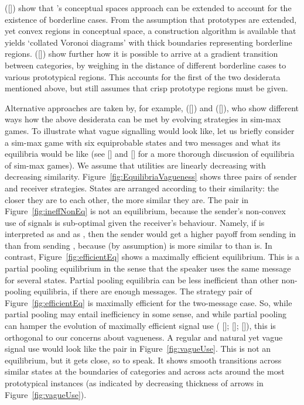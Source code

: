 \documentclass[12pt,english]{article}
\numberwithin{equation}{section}
\newcommand{\citetbjps}[1]{\citeauthor{#1} ([\citeyear{#1}])}
\newcommand{\citealtbjps}[1]{\citeauthor{#1} [\citeyear{#1}]}
\begin{document}
\citetbjps{DouvenDecock2011:Vagueness:-A-Co} show that
\citeauthor{Gardenfors2000:Conceptual-Spac}'s conceptual spaces
approach can be extended to account for the existence of borderline
cases. From the assumption that prototypes are extended, yet convex
regions in conceptual space, a construction algorithm is available
that yields `collated Voronoi diagrams' with thick boundaries
representing borderline
regions. \citetbjps{DecockDouven2012:What-is-Graded-} show further how it
is possible to arrive at a gradient transition between categories, by
weighing in the distance of different borderline cases to various
prototypical regions. This accounts for the first of the two
desiderata mentioned above, but still assumes that crisp prototype
regions must be given.

Alternative approaches are taken by, for example, \citetbjps{FrankeJager2010:Vagueness-Signa} and
\citetbjps{OConnor2013:The-Evolution-o}, who show different ways how the above desiderata can be
met by evolving strategies in sim-max games. To illustrate what vague signalling would look
like, let us briefly consider a sim-max game with six equiprobable states and two messages and
what its equilibria would be like (see \citealtbjps{Jager2007:The-Evolution-o} and \citealtbjps{OConnor2013:The-Evolution-o} for a more thorough discussion of equilibria of
sim-max games). We assume that utilities
are linearly decreasing with decreasing similarity. Figure~\ref{fig:EquilibriaVagueness} shows
three pairs of sender and receiver strategies. States are arranged according to their
similarity: the closer they are to each other, the more similar they are. The pair in
Figure~\ref{fig:ineffNonEq} is not an equilibrium, because the sender's non-convex use of
signals is sub-optimal given the receiver's behaviour. Namely, if  is interpreted as
 and  as , then the sender would get a higher payoff from
sending  in  than from sending , because (by assumption)
 is more similar to  than  is. In contrast,
Figure~\ref{fig:efficientEq} shows a maximally efficient equilibrium. This is a partial pooling
equilibrium in the sense that the speaker uses the same message for several states. Partial
pooling equilibria can be less inefficient than other non-pooling equilibria, if there are
enough messages. The strategy pair of Figure~\ref{fig:efficientEq} is maximally efficient for
the two-message case. So, while partial pooling may entail inefficiency in some sense, and
while partial pooling can hamper the evolution of maximally efficient signal use
(\citealtbjps{Hutteger:2007-Evol-Indicatives-Imperatives}; \citealtbjps{Pawlowitsch2008:Why-Evolution-d}; \citealtbjps{HutteggerSkyrms2010:Evolutionary-Dy}),
this is orthogonal to our concerns about vagueness. A regular and natural yet vague signal use
would look like the pair in Figure~\ref{fig:vagueUse}. This is not an equilibrium, but it gets
close, so to speak. It shows smooth transitions across similar states at the boundaries of
categories and across acts around the most prototypical instances (as indicated by decreasing
thickness of arrows in Figure~\ref{fig:vagueUse}).
\end{document}
